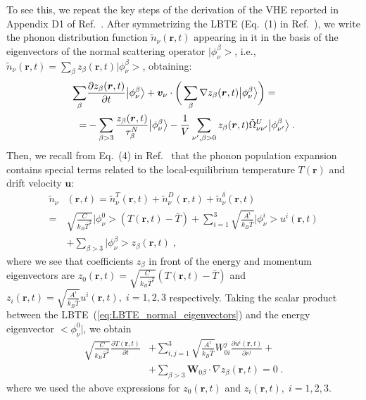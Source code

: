 \documentclass[
prb,
twocolumn,
superscriptaddress,
 amsmath,amssymb,
 aps,
longbibliography,
]{revtex4-2}
\newcommand*{\state}{\ensuremath{\nu}}
\newcommand*{\statep}{\ensuremath{ {\nu'} }}
\begin{document}
To see this, we repeat the key steps of the derivation of the VHE reported in Appendix D1 of Ref.~\cite{Simoncelli2020}.
After symmetrizing the LBTE (Eq.~(1) in Ref.~\cite{Simoncelli2020}), we write the phonon  distribution function $\tilde{n}_{\state}(\bm{r},t)$ appearing in it in the basis of the eigenvectors of the normal scattering operator $\big|\phi_{\state}^{\beta}\big>$, i.e., $\tilde{n}_{\state}(\bm{r},t) = \sum_\beta z_{\beta}(\bm{r},t) \big|\phi_{\state}^{\beta}\big>$, obtaining:
\begin{align}

     \sum_\beta & \frac{\partial  z_\beta(\bm{r},t) }{\partial t}\big|\phi_{\state}^\beta\big> +\bm{v}_{\state}\cdot \bigg(\sum_\beta \nabla z_\beta(\bm{r},t) \big|\phi_{\state}^\beta\big> \bigg) = \nonumber \\
     =& - \sum_{\beta>3} \frac{z_\beta(\bm{r},t)}{\tau^N_\beta} \big|\phi_{\state}^\beta\big> -\frac{1}{V} \sum_{\statep, \beta>0} z_\beta(\bm{r},t) \tilde{\Omega}^U_{\state \statep}\big|\phi_{ \statep}^\beta\big> \;.
     \label{eq:LBTE_normal_eigenvectors}
     \raisetag{2mm}
\end{align}
Then, we recall from Eq.~(4) in Ref.~\cite{Simoncelli2020} that the phonon population expansion contains special terms related to the local-equilibrium temperature $T(\bm{r})$ and drift velocity $\bm{u}$:
\begin{align}
\label{eq:fundamental_projections_2}
  \tilde{n}_{\state}&(\bm{r},t)
  = \tilde{n}^T_{\state}(\bm{r},t) + \tilde{n}^D_{\state}(\bm{r},t) + \tilde{n}^{\delta}_{\state}(\bm{r},t) \nonumber \\
  =& \sqrt{\frac{C}{k_B \bar{T}^2}} \big|\phi^0_{\state}\big> (T(\bm{r},t)-\bar{T}) \nonumber
  + \sum_{i=1}^3 \sqrt{\frac{A^i}{k_B\bar{T}}} \big|\phi^i_{\state}\big> u^i (\bm{r},t)  \\
  &+ \sum_{\beta>3} \big|\phi^\beta_{\state}\big> z_\beta (\bm{r},t)  \;,
\end{align}
where we see that coefficients $z_\beta$ in front of the energy and momentum eigenvectors are $z_0 (\bm{r},t) = \sqrt{\frac{C}{k_B\bar{T}^2}} (T(\bm{r},t)-\bar{T})$ and
    $z_i (\bm{r},t) = \sqrt{\frac{A^i}{k_B\bar{T}}} u^i(\bm{r},t), \; i=1,2,3 $ respectively.
Taking the scalar product between the LBTE~(\ref{eq:LBTE_normal_eigenvectors}) and the energy eigenvector $\big<\phi^0_{\state}\big|$, we obtain \cite{Simoncelli2020}
\begin{align}
  \sqrt{\frac{C}{k_B\bar{T}^2}} \frac{\partial T(\bm{r},t)}{\partial t}
  &+
  \sum_{i,j=1}^3 \sqrt{\frac{A^i}{k_B\bar{T}}} W_{0i}^j \frac{\partial u^i(\bm{r},t)}{\partial r^j} + \nonumber \\
  &+
  \sum_{\beta>3} \bm{W}_{0 \beta}\cdot \nabla z_\beta(\bm{r},t) = 0 \;.
\label{eq:zero_eigenvector_proj}
\end{align}
where we used the above expressions for $z_0 (\bm{r},t)$ and $z_i (\bm{r},t), \; i=1,2,3$.
\end{document}
